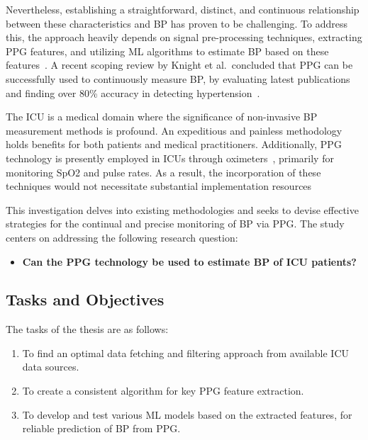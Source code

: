 Nevertheless, establishing a straightforward, distinct, and continuous relationship between these characteristics and BP has proven to be challenging.
To address this, the approach heavily depends on signal pre-processing techniques, extracting PPG features, and utilizing \ac{ML} algorithms to estimate BP based on these features~\cite{el-hajjDeepLearningModels2021}.
A recent scoping review by Knight et al.\ concluded that PPG can be successfully used to continuously measure BP, by evaluating latest publications and finding over 80\% accuracy in detecting hypertension~\cite{knightAccuracyWearablePhotoplethysmography2022}.

The \ac{ICU} is a medical domain where the significance of non-invasive BP measurement methods is profound.
An expeditious and painless methodology holds benefits for both patients and medical practitioners.
Additionally, PPG technology is presently employed in ICUs through oximeters~\cite{aoyagiPulseOximetryIts2002}, primarily for monitoring \ac{SpO2} and pulse rates.
As a result, the incorporation of these techniques would not necessitate substantial implementation resources

\vspace{0.2cm}

This investigation delves into existing methodologies and seeks to devise effective strategies for the continual and precise monitoring of BP via PPG\@.
The study centers on addressing the following research question:

\begin{itemize}
    \item \textbf{Can the PPG technology be used to estimate BP of ICU patients?}
\end{itemize}

\subsection{Tasks and Objectives}
\label{subsec:tasks_objectives}

The tasks of the thesis are as follows:

\begin{enumerate}
    \item To find an optimal data fetching and filtering approach from available ICU data sources.
    \item To create a consistent algorithm for key PPG feature extraction.
    \item To develop and test various ML models based on the extracted features, for reliable prediction of BP from PPG\@.
\end{enumerate}

